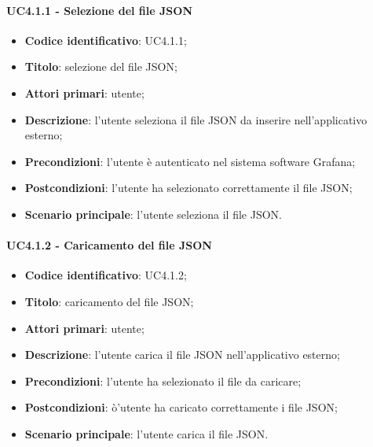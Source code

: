 \paragraph{UC4.1.1 - Selezione del file JSON}
\begin{itemize}
	\item \textbf{Codice identificativo}: UC4.1.1;
	\item \textbf{Titolo}: selezione del file JSON;
	\item \textbf{Attori primari}: utente;
	\item \textbf{Descrizione}: l'utente seleziona il file JSON da inserire nell'applicativo esterno;
	\item \textbf{Precondizioni}: l'utente è autenticato nel sistema software Grafana\glo;
	\item \textbf{Postcondizioni}: l'utente ha selezionato correttamente il file JSON;
	\item \textbf{Scenario principale}: l'utente seleziona il file JSON.
\end{itemize}

\paragraph{UC4.1.2 - Caricamento del file JSON}
\begin{itemize}
	\item \textbf{Codice identificativo}: UC4.1.2;
	\item \textbf{Titolo}: caricamento del file JSON;
	\item \textbf{Attori primari}: utente;
	\item \textbf{Descrizione}: l'utente carica il file JSON nell'applicativo esterno;
	\item \textbf{Precondizioni}: l'utente ha selezionato il file da caricare;
	\item \textbf{Postcondizioni}: ò'utente ha caricato correttamente i file JSON;
	\item \textbf{Scenario principale}: l'utente carica il file JSON.
\end{itemize}

